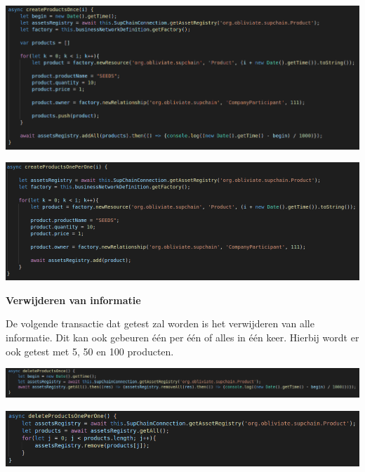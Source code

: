 \documentclass[fleqn,a4paper,12pt]{book}
\begin{document}
\begin{center}
	\includegraphics[width=14cm]{img/test-function-createProductOnce}\\[1cm]
\end{center}
\begin{center}
	\includegraphics[width=14cm]{img/test-function-createProductOnePerOne}\\[1cm]
\end{center}

\textbf{Verwijderen van informatie}

De volgende transactie dat getest zal worden is het verwijderen van alle informatie. Dit kan ook gebeuren één per één of alles in één keer. Hierbij wordt er ook getest met 5, 50 en 100 producten.

\begin{center}
	\includegraphics[width=14cm]{img/test-function-removeProductOnce}\\[1cm]
\end{center}
\begin{center}
	\includegraphics[width=14cm]{img/test-function-removeProductOnePerOne}\\[1cm]
\end{center}
\end{document}
